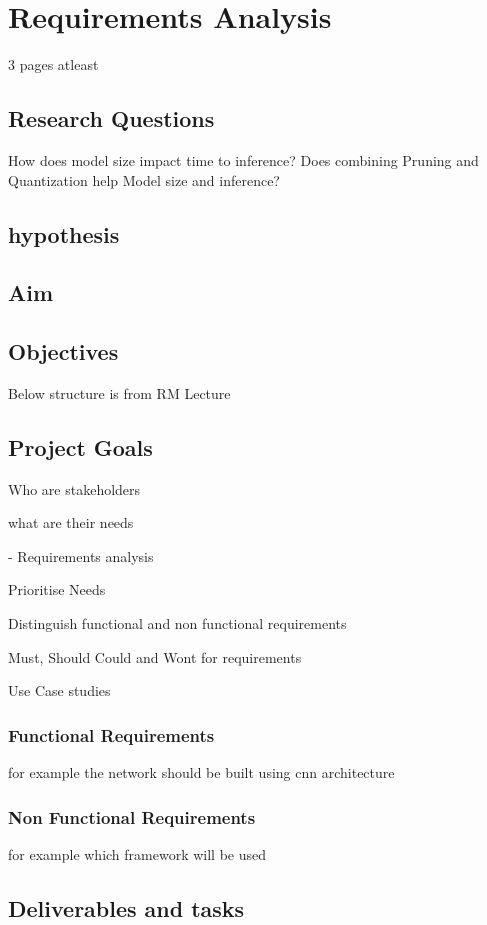 \chapter{Requirements Analysis}
3 pages atleast



\section{Research Questions}
How does model size impact time to inference?
Does combining Pruning and Quantization help Model size and inference?


\section{hypothesis}
\section{Aim}
\section{Objectives}
Below structure is from RM Lecture
\section{Project Goals}
Who are stakeholders

what are their needs

- Requirements analysis

Prioritise Needs

Distinguish functional and non functional requirements

Must, Should Could and Wont for requirements

Use Case studies
\subsection{Functional Requirements}
for example the network should be built using cnn architecture
\subsection{Non Functional Requirements}
for example which framework will be used

\section{Deliverables and tasks}
